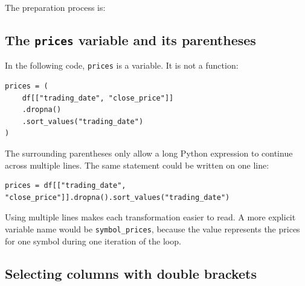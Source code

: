 \documentclass[11pt,a4paper]{article}
\begin{document}
The preparation process is:

\begin{center}
\end{center}

\subsection{The \texttt{prices} variable and its parentheses}

In the following code, \texttt{prices} is a variable. It is not a function:

\begin{lstlisting}[style=python]
prices = (
    df[["trading_date", "close_price"]]
    .dropna()
    .sort_values("trading_date")
)
\end{lstlisting}

The surrounding parentheses only allow a long Python expression to continue
across multiple lines. The same statement could be written on one line:

\begin{lstlisting}[style=python]
prices = df[["trading_date", "close_price"]].dropna().sort_values("trading_date")
\end{lstlisting}

Using multiple lines makes each transformation easier to read. A more explicit
variable name would be \texttt{symbol\_prices}, because the value represents
the prices for one symbol during one iteration of the loop.

\subsection{Selecting columns with double brackets}
\end{document}
